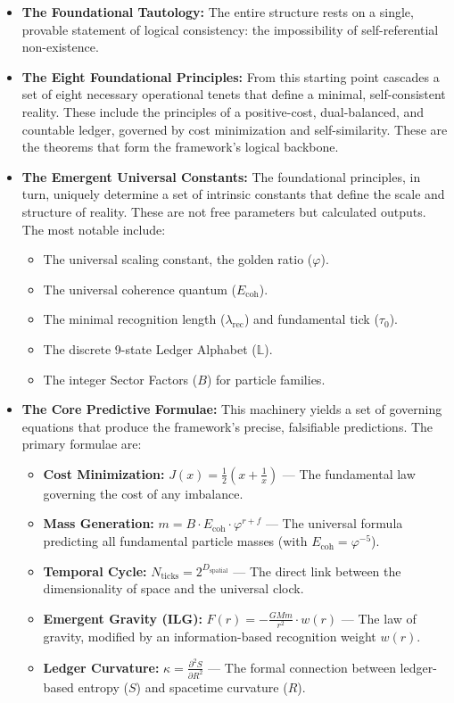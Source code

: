 \begin{itemize}
    \item \textbf{The Foundational Tautology:} The entire structure rests on a single, provable statement of logical consistency: the impossibility of self-referential non-existence.

    \item \textbf{The Eight Foundational Principles:} From this starting point cascades a set of eight necessary operational tenets that define a minimal, self-consistent reality. These include the principles of a positive-cost, dual-balanced, and countable ledger, governed by cost minimization and self-similarity. These are the theorems that form the framework's logical backbone.

    \item \textbf{The Emergent Universal Constants:} The foundational principles, in turn, uniquely determine a set of intrinsic constants that define the scale and structure of reality. These are not free parameters but calculated outputs. The most notable include:
    \begin{itemize}
        \item The universal scaling constant, the golden ratio (\(\varphi\)).
        \item The universal coherence quantum (\(E_{\text{coh}}\)).
        \item The minimal recognition length (\(\lambda_{\text{rec}}\)) and fundamental tick (\(\tau_0\)).
        \item The discrete 9-state Ledger Alphabet (\(\mathbb{L}\)).
        \item The integer Sector Factors (\(B\)) for particle families.
    \end{itemize}

    \item \textbf{The Core Predictive Formulae:} This machinery yields a set of governing equations that produce the framework's precise, falsifiable predictions. The primary formulae are:
    \begin{itemize}
        \item \textbf{Cost Minimization:} \(J(x) = \frac{1}{2}(x + \frac{1}{x})\) — The fundamental law governing the cost of any imbalance.
        \item \textbf{Mass Generation:} \(m = B \cdot E_{\text{coh}} \cdot \varphi^{r + f}\) — The universal formula predicting all fundamental particle masses (with \(E_{\text{coh}}=\varphi^{-5}\)).
        \item \textbf{Temporal Cycle:} \(N_{\text{ticks}} = 2^{D_{\text{spatial}}}\) — The direct link between the dimensionality of space and the universal clock.
        \item \textbf{Emergent Gravity (ILG):} \(F(r) = - \frac{GMm}{r^2} \cdot w(r)\) — The law of gravity, modified by an information-based recognition weight \(w(r)\).
        \item \textbf{Ledger Curvature:} \(\kappa = \frac{\partial^2 S}{\partial R^2}\) — The formal connection between ledger-based entropy (\(S\)) and spacetime curvature (\(R\)).
    \end{itemize}
\end{itemize}
